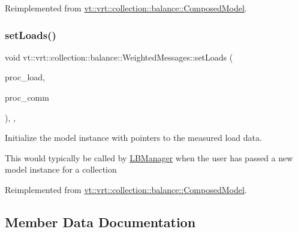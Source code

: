 Reimplemented from \hyperlink{classvt_1_1vrt_1_1collection_1_1balance_1_1_composed_model_a500c3cd4c8e63cfdeea3edb5ddbcba47}{vt\+::vrt\+::collection\+::balance\+::\+Composed\+Model}.

\mbox{\label{structvt_1_1vrt_1_1collection_1_1balance_1_1_weighted_messages_ad0e6b88668ac59f4fb376a2dba81e593}} 
\subsubsection{\texorpdfstring{set\+Loads()}{setLoads()}}
{\footnotesize\ttfamily void vt\+::vrt\+::collection\+::balance\+::\+Weighted\+Messages\+::set\+Loads (\begin{DoxyParamCaption}\item[{std\+::unordered\+\_\+map$<$ \hyperlink{namespacevt_a46ce6733d5cdbd735d561b7b4029f6d7}{Phase\+Type}, \hyperlink{namespacevt_1_1vrt_1_1collection_1_1balance_a5339303db2e1ce964d783a53fd74e6b1}{Load\+Map\+Type} $>$ const $\ast$}]{proc\+\_\+load,  }\item[{std\+::unordered\+\_\+map$<$ \hyperlink{namespacevt_a46ce6733d5cdbd735d561b7b4029f6d7}{Phase\+Type}, \hyperlink{namespacevt_1_1vrt_1_1collection_1_1balance_a01ee1fb0ae2da1d2ab7fdca3be9ae351}{Comm\+Map\+Type} $>$ const $\ast$}]{proc\+\_\+comm }\end{DoxyParamCaption})\hspace{0.3cm}{\ttfamily [inline]}, {\ttfamily [override]}, {\ttfamily [virtual]}}



Initialize the model instance with pointers to the measured load data. 

This would typically be called by \hyperlink{structvt_1_1vrt_1_1collection_1_1balance_1_1_l_b_manager}{L\+B\+Manager} when the user has passed a new model instance for a collection 

Reimplemented from \hyperlink{classvt_1_1vrt_1_1collection_1_1balance_1_1_composed_model_a3a7da5e81a933ea88f87a1226fd3b401}{vt\+::vrt\+::collection\+::balance\+::\+Composed\+Model}.



\subsection{Member Data Documentation}
\mbox{\label{structvt_1_1vrt_1_1collection_1_1balance_1_1_weighted_messages_a23b15544d4d51fa8613dad5727c52732}} 
